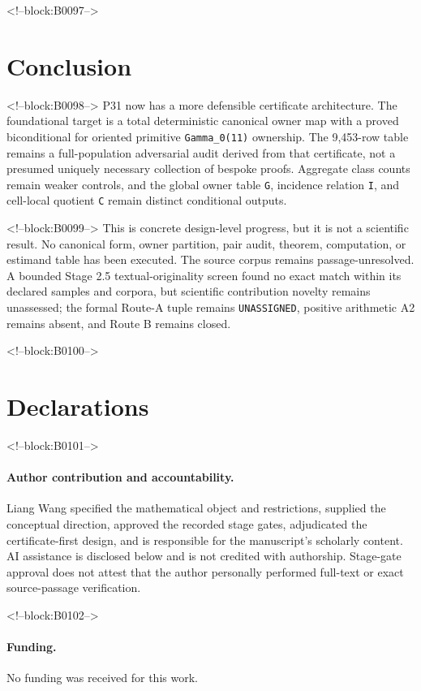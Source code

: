 \documentclass[11pt]{article}
\begin{document}
<!--block:B0097-->
\hypertarget{10-conclusion}{%
\section{Conclusion}\label{10-conclusion}}

<!--block:B0098-->
P31 now has a more defensible certificate architecture. The foundational
target is a total deterministic canonical owner map with a proved
biconditional for oriented primitive \texttt{Gamma\_0(11)} ownership.
The 9,453-row table remains a full-population adversarial audit derived
from that certificate, not a presumed uniquely necessary collection of
bespoke proofs. Aggregate class counts remain weaker controls, and the
global owner table \texttt{G}, incidence relation \texttt{I}, and
cell-local quotient \texttt{C} remain distinct conditional outputs.

<!--block:B0099-->
This is concrete design-level progress, but it is not a scientific
result. No canonical form, owner partition, pair audit, theorem,
computation, or estimand table has been executed. The source corpus
remains passage-unresolved. A bounded Stage 2.5 textual-originality
screen found no exact match within its declared samples and corpora, but
scientific contribution novelty remains unassessed; the formal Route-A
tuple remains \texttt{UNASSIGNED}, positive arithmetic A2 remains absent,
and Route B remains closed.

<!--block:B0100-->
\section*{Declarations}

<!--block:B0101-->
\paragraph{Author contribution and accountability.}
Liang Wang specified the mathematical object and restrictions, supplied
the conceptual direction, approved the recorded stage gates,
adjudicated the certificate-first design, and is responsible for the
manuscript's scholarly content. AI assistance is disclosed below and is
not credited with authorship. Stage-gate approval does not attest that
the author personally performed full-text or exact source-passage
verification.

<!--block:B0102-->
\paragraph{Funding.} No funding was received for this work.
\end{document}
